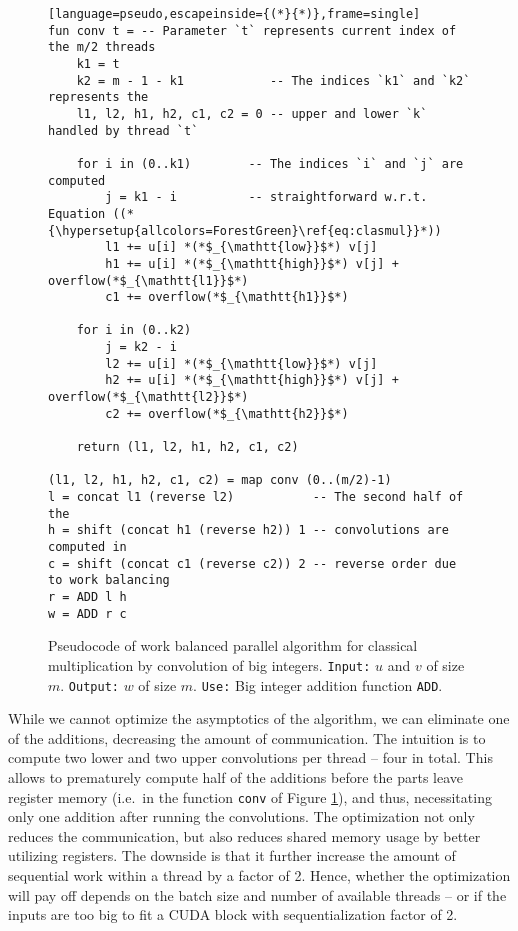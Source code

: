 \begin{figure}[H]
\begin{lstlisting}[language=pseudo,escapeinside={(*}{*)},frame=single]
fun conv t = -- Parameter `t` represents current index of the m/2 threads
    k1 = t
    k2 = m - 1 - k1            -- The indices `k1` and `k2` represents the
    l1, l2, h1, h2, c1, c2 = 0 -- upper and lower `k` handled by thread `t`

    for i in (0..k1)        -- The indices `i` and `j` are computed
        j = k1 - i          -- straightforward w.r.t. Equation ((*{\hypersetup{allcolors=ForestGreen}\ref{eq:clasmul}}*))
        l1 += u[i] *(*$_{\mathtt{low}}$*) v[j]
        h1 += u[i] *(*$_{\mathtt{high}}$*) v[j] + overflow(*$_{\mathtt{l1}}$*)
        c1 += overflow(*$_{\mathtt{h1}}$*)

    for i in (0..k2)
        j = k2 - i
        l2 += u[i] *(*$_{\mathtt{low}}$*) v[j]
        h2 += u[i] *(*$_{\mathtt{high}}$*) v[j] + overflow(*$_{\mathtt{l2}}$*)
        c2 += overflow(*$_{\mathtt{h2}}$*)

    return (l1, l2, h1, h2, c1, c2)

(l1, l2, h1, h2, c1, c2) = map conv (0..(m/2)-1)
l = concat l1 (reverse l2)           -- The second half of the
h = shift (concat h1 (reverse h2)) 1 -- convolutions are computed in
c = shift (concat c1 (reverse c2)) 2 -- reverse order due to work balancing
r = ADD l h
w = ADD r c
\end{lstlisting}
  \caption{\footnotesize Pseudocode of work balanced parallel algorithm for classical multiplication by convolution of big integers. \texttt{Input:} $u$ and $v$ of size $m$. \texttt{Output:} $w$ of size $m$. \texttt{Use:} Big integer addition function \texttt{ADD}.}
  \label{fig:mulparalg}
\end{figure}

While we cannot optimize the asymptotics of the algorithm, we can eliminate one
of the additions, decreasing the amount of communication. The intuition is to
compute two lower and two upper convolutions per thread -- four in total. This
allows to prematurely compute half of the additions before the parts leave
register memory (i.e.\ in the function \texttt{conv} of Figure
\ref{fig:mulparalg}), and thus, necessitating only one addition after running
the convolutions. The optimization not only reduces the communication, but also
reduces shared memory usage by better utilizing registers. The downside is that
it further increase the amount of sequential work within a thread by a factor of
2. Hence, whether the optimization will pay off depends on the batch size and
number of available threads -- or if the inputs are too big to fit a CUDA block
with sequentialization factor of 2.

